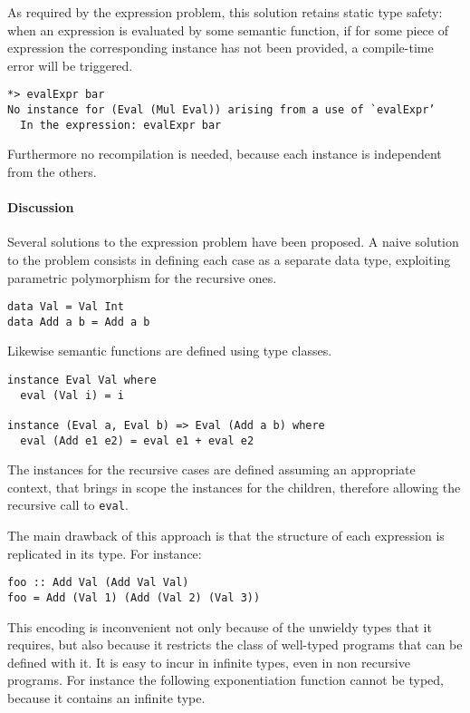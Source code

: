 \documentclass[../Thesis.tex]{subfiles}
\begin{document}
As required by the expression problem, this solution retains static type safety:
when an expression is evaluated by some semantic function,
if for some piece of expression the corresponding instance has
not been provided, a compile-time error will be triggered.

\begin{verbatim}
*> evalExpr bar
No instance for (Eval (Mul Eval)) arising from a use of `evalExpr’
  In the expression: evalExpr bar
\end{verbatim}

Furthermore no recompilation is needed, because each instance is independent from the others.

\paragraph{Discussion}
Several solutions to the expression problem have been proposed.
A naive solution to the problem consists in defining each case as a separate data type, exploiting parametric polymorphism for the recursive ones.

\begin{verbatim}
data Val = Val Int
data Add a b = Add a b
\end{verbatim}

Likewise semantic functions are defined using type classes.

\begin{verbatim}
instance Eval Val where
  eval (Val i) = i

instance (Eval a, Eval b) => Eval (Add a b) where
  eval (Add e1 e2) = eval e1 + eval e2
\end{verbatim}

The instances for the recursive cases are defined assuming an appropriate 
context, that brings in scope the instances for the children, therefore allowing
the recursive call to \texttt{eval}.

The main drawback of this approach is that the structure of each expression is replicated in its type. For instance:

\begin{verbatim}
foo :: Add Val (Add Val Val)
foo = Add (Val 1) (Add (Val 2) (Val 3))
\end{verbatim}

This encoding is inconvenient not only because of the unwieldy types
that it requires, but also because it restricts the class of well-typed programs that can be defined with it. It is easy to incur in infinite types, even in
non recursive programs.
For instance the following exponentiation function cannot be typed, because it contains an infinite type.
\end{document}
